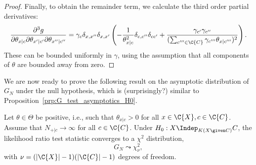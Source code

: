 \begin{proof}
Finally, to obtain the remainder term, we calculate the third order partial derivatives:
  $$\frac{\partial^3 g}{\partial \theta_{x|c} \partial \theta_{x'|c'} \partial \theta_{x''|c''}} = 
  \gamma_c \delta_{x,x''} \delta_{x,x'} \left( -\frac{1}{\theta_{x|c}^2} \delta_{c,c''} \delta_{cc'} + \frac{\gamma_{c'}\gamma_{c''} }{(\sum_{c'''\in\C{C}} \gamma_{c'''} \theta_{x|c'''})^2} \right).
  $$
These can be bounded uniformly in $\gamma$, using the assumption that all components of $\theta$ are bounded away from zero.
\end{proof}
We are now ready to prove the following result on the asymptotic distribution of $G_N$ under the null hypothesis, which is (surprisingly?) similar to Proposition~\ref{prp:G_test_asymptotics_H0}.
\begin{Prp}\label{prp:ext_G_test_asymptotics_H0}
  Let $\theta \in \Theta$ be positive, i.e., such that $\theta_{x|c} > 0$ for all $x \in \C{X}, c \in \C{C}$.
  Assume that $N_{+|c} \to \infty$ for all $c \in \C{C}$.
  Under $H_0 : X \Indep_{K(X \given C)} C$, the likelihood ratio test statistic  converges
  to a $\chi^2$ distribution,
  $$G_N \leadsto \chi^2_\nu,$$
  with $\nu = (|\C{X}| - 1)(|\C{C}| - 1)$ degrees of freedom.
\end{Prp}
